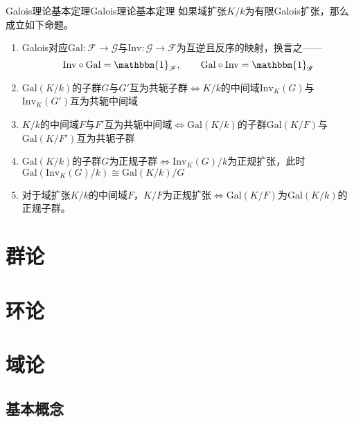 \documentclass[lang = cn, scheme = chinese, thmcnt = section, usesamecnt]{elegantbook}
\newcommand{\Gal}{\mathrm{Gal}}
\newcommand{\Inv}{\mathrm{Inv}}
\begin{document}
\begin{theorem}{Galois理论基本定理}{Galois理论基本定理}
	如果域扩张$K/k$为有限Galois扩张，那么成立如下命题。
	\begin{enumerate}
		\item Galois对应$\Gal:\mathscr{F}\to \mathscr{G}$与$\Inv:\mathscr{G}\to \mathscr{F}$为互逆且反序的映射，换言之——%
		$$
		\Inv\circ\Gal=\mathbbm{1}_{\mathscr{F}},\qquad
		\Gal\circ\Inv=\mathbbm{1}_{\mathscr{G}}
		$$
		\item $\Gal(K/k)$的子群$G$与$G'$互为共轭子群$\iff K/k$的中间域$\Inv_K(G)$与$\Inv_K(G')$互为共轭中间域
		\item $K/k$的中间域$F$与$F'$互为共轭中间域$\iff\Gal(K/k)$的子群$\Gal(K/F)$与$\Gal(K/F')$互为共轭子群
		\item$\Gal(K/k)$的子群$G$为正规子群$\iff \Inv_K(G)/k$为正规扩张，此时$\Gal(\Inv_K(G)/k)\cong \Gal(K/k)/G$
		\item 对于域扩张$K/k$的中间域$F$，$K/F$为正规扩张$\iff\Gal(K/F)$为$\Gal(K/k)$的正规子群。
	\end{enumerate}
\end{theorem}


















\appendix

\chapter{群论}

\chapter{环论}

\chapter{域论}

\section{基本概念}
\end{document}
